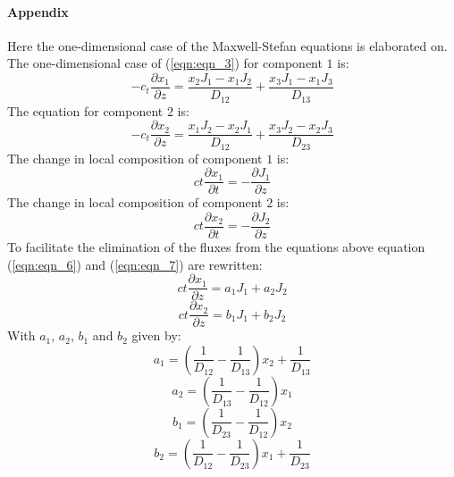 \documentclass[twocolumn]{article}
\begin{document}
\paragraph*{Appendix}
Here the one-dimensional case of the Maxwell-Stefan equations is elaborated on. The one-dimensional case of (\ref{eqn:eqn_3}) for component $1$ is:
\begin{equation}
\label{eqn:eqn_6}
-c_t \frac{\partial x_1}{\partial z} = \frac{x_2 J_1 - x_1 J_2}{D_{12}} + \frac{x_3 J_1 - x_1 J_3}{D_{13}}
\end{equation}
The equation for component $2$ is:
\begin{equation}
\label{eqn:eqn_7}
-c_t \frac{\partial x_2}{\partial z} = \frac{x_1 J_2 - x_2 J_1}{D_{12}} + \frac{x_3 J_2 - x_2 J_3}{D_{23}}
\end{equation}
The change in local composition of component $1$ is:
\begin{equation}
\label{eqn:eqn_8}
ct \frac{\partial x_1}{\partial t} = - \frac{\partial J_1}{\partial z}
\end{equation}
The change in local composition of component $2$ is:
\begin{equation}
\label{eqn:eqn_9}
ct \frac{\partial x_2}{\partial t} = - \frac{\partial J_2}{\partial z}
\end{equation}
To facilitate the elimination of the fluxes from the equations above equation (\ref{eqn:eqn_6}) and (\ref{eqn:eqn_7}) are rewritten:
\begin{equation}
\label{eqn:eqn_10}
ct \frac{\partial x_1}{\partial z} = a_1 J_1 + a_2 J_2
\end{equation}
\begin{equation}
\label{eqn:eqn_11}
ct \frac{\partial x_2}{\partial z} = b_1 J_1 + b_2 J_2
\end{equation}
With $a_1$, $a_2$, $b_1$ and $b_2$ given by:
\begin{equation}
\label{eqn:eqn_12}
a_1 = \left( \frac{1}{D_{12}} - \frac{1}{D_{13}} \right) x_2 + \frac{1}{D_{13}}
\end{equation}
\begin{equation}
\label{eqn:eqn_13}
a_2 = \left( \frac{1}{D_{13}} - \frac{1}{D_{12}} \right) x_1
\end{equation}
\begin{equation}
\label{eqn:eqn_14}
b_1 = \left( \frac{1}{D_{23}} - \frac{1}{D_{12}} \right) x_2
\end{equation}
\begin{equation}
\label{eqn:eqn_15}
b_2 = \left( \frac{1}{D_{12}} - \frac{1}{D_{23}} \right) x_1 + \frac{1}{D_{23}}
\end{equation}
\end{document}
